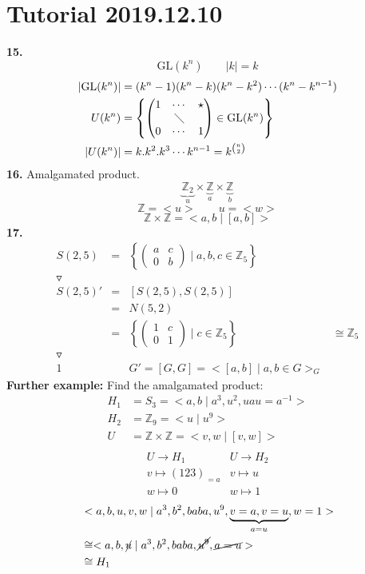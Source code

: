 \documentclass{article}
\let\ddd\cdots
\newcommand{\Z}{\mathbb{Z}}
\newcommand{\abs}[1]{\left|#1\right|}
\theoremstyle{definition}
\theoremstyle{remark}
\theoremstyle{example}
\begin{document}
	\section*{Tutorial 2019.12.10}
	\textbf{15.}
	\[\mathrm{GL} (k^n) \qquad \abs{k}=k\]
	\begin{align*}
		\abs{\mathrm{GL}(k^n)}&=(k^n-1)(k^n-k)(k^n-k^2)\ddd(k^n-k^{n-1})\\
		U(k^n)&=\left\{
		\begin{pmatrix}
			1 & \ddd & \star\\
			& \diagdown\\
			0 & \ddd & 1
		\end{pmatrix} \in \mathrm{GL}(k^n)\right\}\\
		\abs{U(k^n)}&=k.k^2.k^3 \ddd k^{n-1}=k^{n \choose 2}
	\end{align*}
	\textbf{16.}
	Amalgamated product. \[\underbrace{\Z_2}_u \times \underbrace{\Z}_a \times \underbrace{\Z}_b \]
	\[\Z=<u> \qquad u=<w>\]
	\[\Z \times \Z= <a,b \mid [a,b]>\]
	\textbf{17.}
	\[\begin{matrix}
		S(2,5)&=&\left\{\begin{pmatrix}
			a & c\\
			0 & b
		\end{pmatrix} \mid a,b,c \in \Z_5 \right\}\\
		\triangledown\\
		S(2,5)'&=&[S(2,5),S(2,5)]\\
		&=&N(5,2)\\
		&=&\left\{\begin{pmatrix}
			1 & c\\
			0 & 1
		\end{pmatrix} \mid c \in \Z_5\right\} & \cong \Z_5\\
		\triangledown\\
		1 & & G'=[G,G]=<[a,b]\mid a,b \in G>_G
	\end{matrix}\]
	\textbf{Further example:}
	Find the amalgamated product:
	\begin{align*}
		H_1 &= S_3=<a,b \mid a^3,u^2, uau=a^{-1}>\\
		H_2 &= \Z_9=<u \mid u^9>\\
		U&= \Z\times \Z = <v,w \mid [v,w]>\\
	\end{align*}
	\[\begin{matrix}
		U \to H_1 & U \to H_2\\
		v \mapsto (123)_{=a} & v \mapsto u\\
		w \mapsto 0 & w \mapsto 1
	\end{matrix}\]
	\begin{align*}
		&<a,b,u,v,w \mid a^3, b^2, baba, u^9, \underbrace{v=a, v=u}_{a=u},w=1>\\
		&\cong <a,b,\cancel{u} \mid a^3,b^2,baba,\cancel{u^9},\cancel{a=u}>\\
		&\cong H_1
	\end{align*}\\
	\\
	
\end{document}
